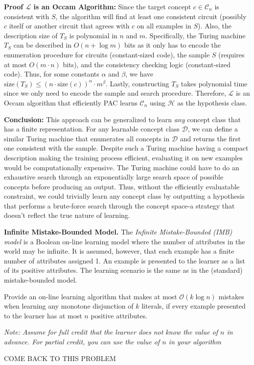 \documentclass[11pt]{article}
\DeclareMathOperator{\1}{\mathbbm{1}}
\begin{document}
\begin{problem} [10pts]
\textbf{Proof $\mathcal{L}$ is an Occam Algorithm:} Since the target concept $c \in \mathcal{C}_n$ is consistent with $S$, the algorithm will find at least one consistent circuit (possibly $c$ itself or another circuit that agrees with $c$ on all examples in $S$). Also, the description size of $T_S$ is polynomial in $n$ and $m$. Specifically, the Turing machine $T_S$ can be described in $O(n + \log m)$ bits as it only has to encode the enumeration procedure for circuits (constant-sized code), the sample $S$ (requires at most $O(m \cdot n)$ bits), and the consistency checking logic (constant-sized code). Thus, for some constants $\alpha$ and $\beta$, we have $\text{size}(T_S) \leq (n \cdot \text{size}(c))^\alpha \cdot m^\beta$. Lastly, constructing $T_S$ takes polynomial time since we only need to encode the sample and search procedure. Therefore, $\mathcal{L}$ is an Occam algorithm that efficiently PAC learns $\mathcal{C}_n$ using $\mathcal{H}$ as the hypothesis class.

\textbf{Conclusion:} This approach can be generalized to learn \textit{any} concept class that has a finite representation. For any learnable concept class $\mathcal{D}$, we can define a similar Turing machine that enumerates all concepts in $\mathcal{D}$ and returns the first one consistent with the sample. Despite such a Turing machine having a compact description making the training process efficient, evaluating it on new examples would be computationally expensive. The Turing machine could have to do an exhaustive search through an exponentially large search space of possible concepts before producing an output. Thus, without the efficiently evaluatable constraint, we could trivially learn any concept class by outputting a hypothesis that performs a brute-force search through the concept space-a strategy that doesn't reflect the true nature of learning.

\end{problem}
\begin{problem} [15pts] \textbf{Infinite Mistake-Bounded Model.}
	The \textit{Infinite Mistake-Bounded (IMB) model} is a Boolean on-line learning model where the number
of attributes in the world may be infinite. It is assumed, however, that each example has a finite
number of attributes assigned 1. An example is presented to the learner as a list of its positive
attributes. The learning scenario is the same as in the (standard) mistake-bounded model.

Provide an on-line learning algorithm that makes at most $\mathcal O(k \log n)$ mistakes when learning any
monotone disjunction of $k$ literals, if every example presented to the learner has at most $n$ positive
attributes.

\textit{Note: Assume for full credit that the learner does \textit{not} know the value of $n$ in advance. For partial credit, you can use the value of $n$ in your algorithm}

COME BACK TO THIS PROBLEM
\end{problem}
\end{document}
